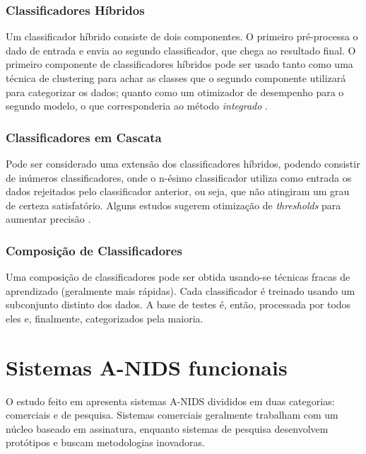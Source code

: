  \subsection{Classificadores Híbridos}
    Um classificador híbrido consiste de dois componentes. O primeiro pré-processa o dado de entrada e envia ao segundo
    classificador, que chega ao resultado final. O primeiro componente de classificadores híbridos pode ser usado tanto
    como uma técnica de clustering para achar as classes que o segundo componente utilizará para categorizar os dados;
    quanto como um otimizador de desempenho para o segundo modelo, o que corresponderia ao método \textit{integrado}
    \cite{aydin09}.


 \subsection{Classificadores em Cascata}
    Pode ser considerado uma extensão dos classificadores híbridos, podendo consistir de inúmeros classificadores, onde
    o n-ésimo classificador utiliza como entrada os dados rejeitados pelo classificador anterior, ou seja, que não
    atingiram um grau de certeza satisfatório. Alguns estudos sugerem otimização de \emph{thresholds} para aumentar precisão
    \cite{oliveira05}.

 \subsection{Composição de Classificadores}
    Uma composição de classificadores pode ser obtida usando-se técnicas fracas de aprendizado
    (geralmente mais rápidas). Cada classificador é treinado usando um subconjunto distinto dos dados.
    A base de testes é, então, processada por todos eles e, finalmente, categorizados pela maioria.


\chapter{Sistemas A-NIDS funcionais}
    O estudo feito em \cite{teodoro09} apresenta sistemas A-NIDS divididos em duas categorias: comerciais e de pesquisa.
    Sistemas comerciais geralmente trabalham com um núcleo baseado em assinatura, enquanto sistemas de pesquisa
    desenvolvem protótipos e buscam metodologias inovadoras.

